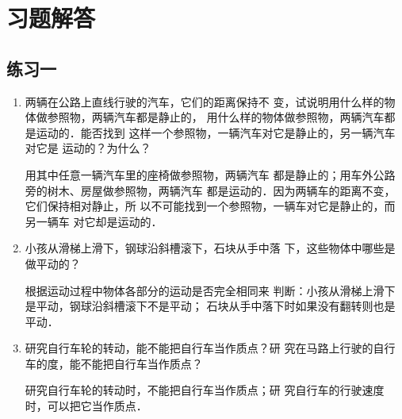 \section{习题解答}
\subsection{练习一}
\begin{enumerate}
    \item 两辆在公路上直线行驶的汽车，它们的距离保持不
变，试说明用什么样的物体做参照物，两辆汽车都是静止的，
用什么样的物体做参照物，两辆汽车都是运动的．能否找到
这样一个参照物，一辆汽车对它是静止的，另一辆汽车对它是
运动的？为什么？


\begin{solution}
用其中任意一辆汽车里的座椅做参照物，两辆汽车
都是静止的；用车外公路旁的树木、房屋做参照物，两辆汽车
都是运动的．因为两辆车的距离不变，它们保持相对静止，所
以不可能找到一个参照物，一辆车对它是静止的，而另一辆车
对它却是运动的．
\end{solution}

\item 小孩从滑梯上滑下，钢球沿斜槽滚下，石块从手中落
下，这些物体中哪些是做平动的？

\begin{solution}
根据运动过程中物体各部分的运动是否完全相同来
判断：小孩从滑梯上滑下是平动，钢球沿斜槽滚下不是平动；
石块从手中落下时如果没有翻转则也是平动．
\end{solution}

\item 研究自行车轮的转动，能不能把自行车当作质点？研
究在马路上行驶的自行车的度，能不能把自行车当作质点？

\begin{solution}
    研究自行车轮的转动时，不能把自行车当作质点；研
    究自行车的行驶速度时，可以把它当作质点．
\end{solution}
\end{enumerate}


